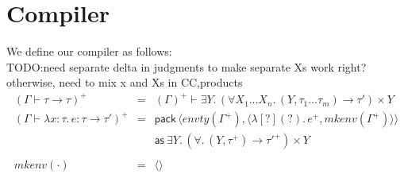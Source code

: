\documentclass{article}
\newcommand{\lit}[1]{\textsf{#1}}
\newcommand{\decl}[2]{#1{:}#2}
\newcommand{\bind}[2]{#1.\, #2}
\newcommand{\tbind}[3]{\bind{\decl{#1}{#2}}{#3}}
\newcommand{\eunit}{\langle \rangle}
\newcommand{\epair}[2]{\langle #1, #2 \rangle}
\newcommand{\epackspaced}[5]{\lit{pack}\,\langle #1,#2 \rangle #3\lit{as}\:{\texist #4 #5}}
\newcommand{\elam}[3]{\lambda \tbind{#1}{#2}{#3}}
\newcommand{\tprod}[2]{#1 \times #2}
\newcommand{\tforall}[2]{\forall \bind{#1}{#2}}
\newcommand{\texist}[2]{\exists \bind{#1}{#2}}
\newcommand{\cclam}[3]{\lambda \bind{[{#1}]({#2})}{#3}}
\begin{document}
\section{Compiler}
We define our compiler as follows:
\\TODO:need separate delta in judgments to make separate Xs work right?otherwise, need to mix x and Xs in CC,products
\[\begin{array}{lcl}
(\Gamma \vdash \tau \to \tau)^+ &=& (\Gamma)^+ \vdash \texist Y {\tprod{(\tforall {X_1...X_n}{(Y, \tau_1...\tau_m) \to \tau'})}Y}\\
(\Gamma \vdash \elam x \tau e : \tau \to \tau')^+ &=& 
	\epackspaced {envty(\Gamma^+)}
	{\epair {\cclam {?} {?} {e^+}}{mkenv(\Gamma^+)}}{\\&&}
	Y {\tprod{(\tforall {}{(Y, \tau^+) \to \tau'^+})}Y}\\
\\
mkenv(\cdot) &=& \eunit
\end{array}\]
\end{document}
